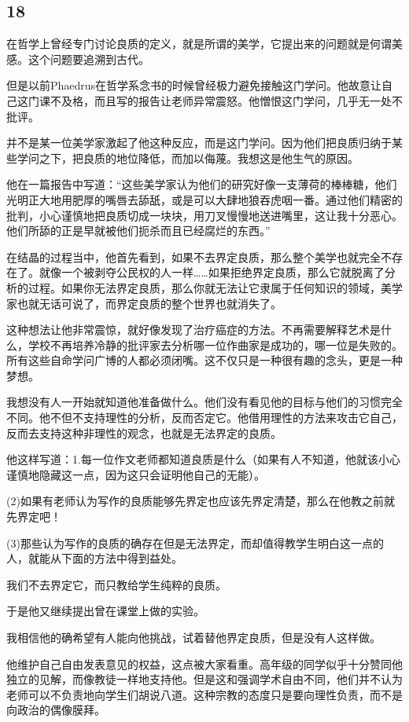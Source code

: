 \documentclass[UTF8]{article}
\begin{document}
\subsection*{18}
\par 在哲学上曾经专门讨论良质的定义，就是所谓的美学，它提出来的问题就是何谓美感。这个问题要追溯到古代。
\par 但是以前Phaedrus在哲学系念书的时候曾经极力避免接触这门学问。他故意让自己这门课不及格，而且写的报告让老师异常震怒。他憎恨这门学问，几乎无一处不批评。
\par 并不是某一位美学家激起了他这种反应，而是这门学问。因为他们把良质归纳于某些学问之下，把良质的地位降低，而加以侮蔑。我想这是他生气的原因。
\par 他在一篇报告中写道：“这些美学家认为他们的研究好像一支薄荷的棒棒糖，他们光明正大地用肥厚的嘴唇去舔舐，或是可以大肆地狼吞虎咽一番。通过他们精密的批判，小心谨慎地把良质切成一块块，用刀叉慢慢地送进嘴里，这让我十分恶心。他们所舔的正是早就被他们扼杀而且已经腐烂的东西。”
\par 在结晶的过程当中，他首先看到，如果不去界定良质，那么整个美学也就完全不存在了。就像一个被剥夺公民权的人一样……如果拒绝界定良质，那么它就脱离了分析的过程。如果你无法界定良质，那么你就无法让它隶属于任何知识的领域，美学家也就无话可说了，而界定良质的整个世界也就消失了。
\par 这种想法让他非常震惊，就好像发现了治疗癌症的方法。不再需要解释艺术是什么，学校不再培养冷静的批评家去分析哪一位作曲家是成功的，哪一位是失败的。所有这些自命学问广博的人都必须闭嘴。这不仅只是一种很有趣的念头，更是一种梦想。
\par 我想没有人一开始就知道他准备做什么。他们没有看见他的目标与他们的习惯完全不同。他不但不支持理性的分析，反而否定它。他借用理性的方法来攻击它自己，反而去支持这种非理性的观念，也就是无法界定的良质。
\par 他这样写道：1.每一位作文老师都知道良质是什么（如果有人不知道，他就该小心谨慎地隐藏这一点，因为这只会证明他自己的无能）。
\par (2)如果有老师认为写作的良质能够先界定也应该先界定清楚，那么在他教之前就先界定吧！
\par (3)那些认为写作的良质的确存在但是无法界定，而却值得教学生明白这一点的人，就能从下面的方法中得到益处。
\par 我们不去界定它，而只教给学生纯粹的良质。
\par 于是他又继续提出曾在课堂上做的实验。
\par 我相信他的确希望有人能向他挑战，试着替他界定良质，但是没有人这样做。
\par 他维护自己自由发表意见的权益，这点被大家看重。高年级的同学似乎十分赞同他独立的见解，而像教徒一样地支持他。但是这和强调学术自由不同，他们并不认为老师可以不负责地向学生们胡说八道。这种宗教的态度只是要向理性负责，而不是向政治的偶像膜拜。
\end{document}
